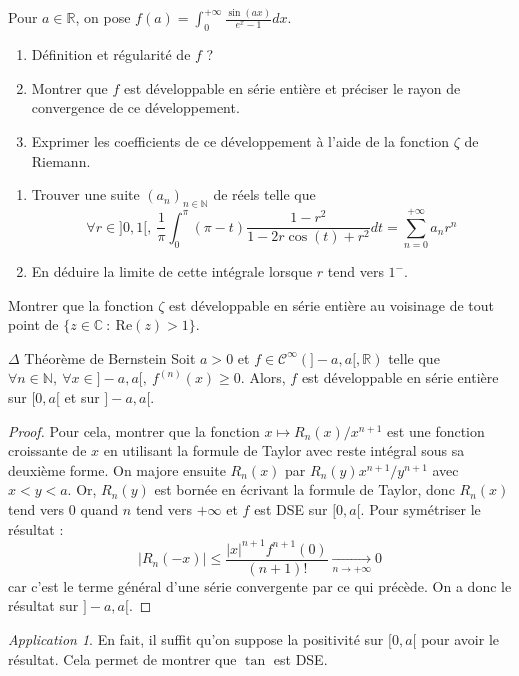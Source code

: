 \documentclass[french,a4paper]{article}
\newcommand{\N}{\mathbb{N}}
\newcommand{\R}{\mathbb{R}}
\newcommand{\C}{\mathbb{C}}
\theoremstyle{plain}
\theoremstyle{definition}
\theoremstyle{remark}
\newtheorem*{app}{Application}
\begin{document}
\begin{ex}[Moulin.SE.48]{}
	Pour $a\in\R$, on pose $f(a)=\displaystyle\int_{0}^{+\infty}\frac{\sin(ax)}{e^x-1}dx$.
	\begin{enumerate}
		\item Définition et régularité de $f$ ?
		\item Montrer que $f$ est développable en série entière et préciser le rayon de convergence de ce développement.
		\item Exprimer les coefficients de ce développement à l'aide de la fonction $\zeta$ de Riemann.
	\end{enumerate}
\end{ex}

\begin{ex}[Moulin.SE.49]{}
	\begin{enumerate}
		\item Trouver une suite $(a_n)_{n\in\N}$ de réels telle que $$\forall r\in]0,1[,\ \frac{1}{\pi}\int_{0}^{\pi}(\pi-t)\frac{1-r^2}{1-2r\cos(t)+r^2}dt=\sum_{n=0}^{+\infty}a_nr^n$$
		\item En déduire la limite de cette intégrale lorsque $r$ tend vers $1^-$.
	\end{enumerate}
\end{ex}

\begin{ex}[Moulin.SE.50]{}
	Montrer que la fonction $\zeta$ est développable en série entière au voisinage de tout point de $\{z\in\C\ : \ \text{Re}(z)>1\}$.
\end{ex}

\begin{ex}{$\Delta$ Théorème de Bernstein} Soit $a>0$ et $f\in\mathcal{C}^\infty(]-a,a[,\R)$ telle que $\forall n\in\N,\ \forall x\in]-a,a[,\ f^{(n)}(x)\geqslant 0$. Alors, $f$ est développable en série entière sur $[0,a[$ et sur $]-a,a[$.
\end{ex} \begin{proof}
	Pour cela, montrer que la fonction $x\mapsto R_n(x)/x^{n+1}$ est une fonction croissante de $x$ en utilisant la formule de Taylor avec reste intégral sous sa deuxième forme. On majore ensuite $R_n(x)$ par $R_n(y)x^{n+1}/y^{n+1}$ avec $x<y<a$. Or, $R_n(y)$ est bornée en écrivant la formule de Taylor, donc $R_n(x)$ tend vers $0$ quand $n$ tend vers $+\infty$ et $f$ est DSE sur $[0,a[$. Pour symétriser le résultat : $$\lvert R_n(-x)\rvert \leqslant \frac{\lvert x\rvert^{n+1}f^{n+1}(0)}{(n+1)!}\xrightarrow[n\to+\infty]{}0$$ car c'est le terme général d'une série convergente par ce qui précède. On a donc le résultat sur $]-a,a[$.
\end{proof}
\begin{app}
	En fait, il suffit qu'on suppose la positivité sur $[0,a[$ pour avoir le résultat. Cela permet de montrer que $\tan$ est DSE. 
\end{app}
\end{document}
